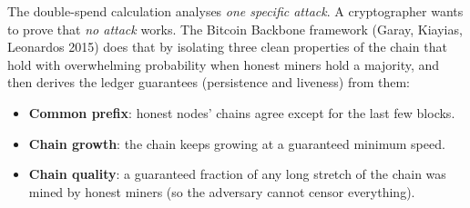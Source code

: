\documentclass[11pt,a4paper]{article}
\newenvironment{plainenglish}{\par\smallskip}{\par\smallskip}
\theoremstyle{definition}
\theoremstyle{plain}
\theoremstyle{remark}
\begin{document}
\begin{plainenglish}
The double-spend calculation analyses \emph{one specific attack}. A cryptographer wants to prove that \emph{no attack} works. The Bitcoin Backbone framework (Garay, Kiayias, Leonardos 2015) does that by isolating three clean
properties of the chain that hold with overwhelming probability when honest miners hold a majority, and then derives the ledger guarantees (persistence and liveness) from them:
\begin{itemize}[nosep]
\item \textbf{Common prefix}: honest nodes' chains agree except for the last few blocks.
\item \textbf{Chain growth}: the chain keeps growing at a guaranteed minimum speed.
\item \textbf{Chain quality}: a guaranteed fraction of any long stretch of the chain was mined by honest miners (so the adversary cannot censor everything).
\end{itemize}
\end{plainenglish}
\end{document}
